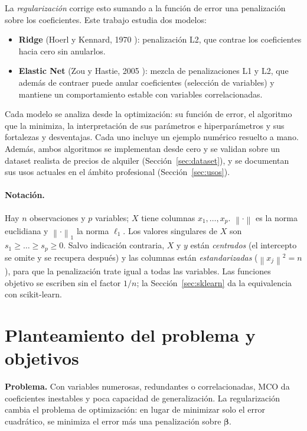 \documentclass[11pt,a4paper]{article}
\newcommand{\norm}[1]{\left\lVert #1 \right\rVert}
\newcommand{\bt}{\bm{\beta}}
\theoremstyle{simple}
\begin{document}
La \emph{regularización} corrige esto sumando a la función de error una penalización sobre los coeficientes. Este trabajo estudia dos modelos:
\begin{itemize}
\item \textbf{Ridge} (Hoerl y Kennard, 1970 \cite{hoerl1970}): penalización L2, que contrae los coeficientes hacia cero sin anularlos.
\item \textbf{Elastic Net} (Zou y Hastie, 2005 \cite{zou2005}): mezcla de penalizaciones L1 y L2, que además de contraer puede anular coeficientes (selección de variables) y mantiene un comportamiento estable con variables correlacionadas.
\end{itemize}
Cada modelo se analiza desde la optimización: su función de error, el algoritmo que la minimiza, la interpretación de sus parámetros e hiperparámetros y sus fortalezas y desventajas. Cada uno incluye un ejemplo numérico resuelto a mano. Además, ambos algoritmos se implementan desde cero y se validan sobre un dataset realista de precios de alquiler (Sección~\ref{sec:dataset}), y se documentan sus usos actuales en el ámbito profesional (Sección~\ref{sec:usos}).

\paragraph{Notación.} Hay $n$ observaciones y $p$ variables; $X$ tiene columnas $x_1,\dots,x_p$. $\norm{\cdot}$ es la norma euclidiana y $\norm{\cdot}_1$ la norma $\ell_1$. Los valores singulares de $X$ son $s_1\ge\dots\ge s_p\ge0$. Salvo indicación contraria, $X$ y $y$ están \emph{centrados} (el intercepto se omite y se recupera después) y las columnas están \emph{estandarizadas} ($\norm{x_j}^2=n$), para que la penalización trate igual a todas las variables. Las funciones objetivo se escriben sin el factor $1/n$; la Sección~\ref{sec:sklearn} da la equivalencia con scikit-learn.

\section{Planteamiento del problema y objetivos}
\textbf{Problema.} Con variables numerosas, redundantes o correlacionadas, MCO da coeficientes inestables y poca capacidad de generalización. La regularización cambia el problema de optimización: en lugar de minimizar solo el error cuadrático, se minimiza el error más una penalización sobre $\bt$.
\end{document}
